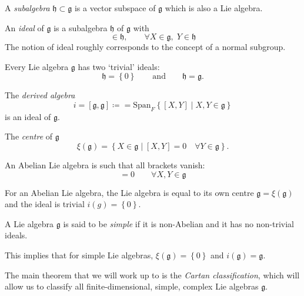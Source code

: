 \begin{definition}[subalgebra]
  A \emph{subalgebra} $\mathfrak{h} \subset \mathfrak{g}$ is a vector subspace of $\mathfrak{g}$ which is also a Lie algebra.
\end{definition}

\begin{definition}[ideal]
  An \emph{ideal} of $\mathfrak{g}$ is a subalgebra $\mathfrak{h}$ of $\mathfrak{g}$ with
  \begin{equation}
    [X, Y] \in \mathfrak{h}, \qquad \forall X \in \mathfrak{g},\; Y \in \mathfrak{h}
  \end{equation}
  The notion of ideal roughly corresponds to the concept of a normal subgroup.
\end{definition}

\begin{example}
  Every Lie algebra $\mathfrak{g}$ has two `trivial' ideals:
  \begin{equation}
    \mathfrak{h} = \left\{ 0 \right\} \qquad \text{and} \qquad \mathfrak{h} = \mathfrak{g}.
  \end{equation}
\end{example}
\begin{example}
  The \emph{derived algebra}
  \begin{equation}
    i = [\mathfrak{g}, \mathfrak{g}] \coloneq = \text{Span}_F \left\{ [X, Y] \mid X, Y \in \mathfrak{g} \right\}
  \end{equation}
  is an ideal of $\mathfrak{g}$.
\end{example}
\begin{example}[centre]
  The \emph{centre} of $\mathfrak{g}$
  \begin{equation}
    \xi(\mathfrak{g}) = \left\{ X \in \mathfrak{g} \mid [X, Y] = 0 \quad \forall Y \in \mathfrak{g} \right\}.
  \end{equation}
\end{example}

\begin{definition}[abelian]
  An Abelian Lie algebra is such that all brackets vanish:
  \begin{equation}
    [X, Y] = 0 \qquad \forall X, Y \in \mathfrak{g}
  \end{equation}
\end{definition}

For an Abelian Lie algebra, the Lie algebra is equal to its own centre $\mathfrak{g} = \xi(\mathfrak{g})$ and the ideal is trivial $i(g) = \left\{ 0 \right\}$.

\begin{definition}[simple]
  A Lie algebra $\mathfrak{g}$ is said to be \emph{simple} if it is non-Abelian and it has no non-trivial ideals.
\end{definition}
This implies that for simple Lie algebras, $\xi(\mathfrak{g}) = \left\{ 0 \right\}$ and $i(\mathfrak{g}) = \mathfrak{g}$.

The main theorem that we will work up to is the \emph{Cartan classification}, which will allow us to classify all finite-dimensional, simple, complex Lie algebras $\mathfrak{g}$.
